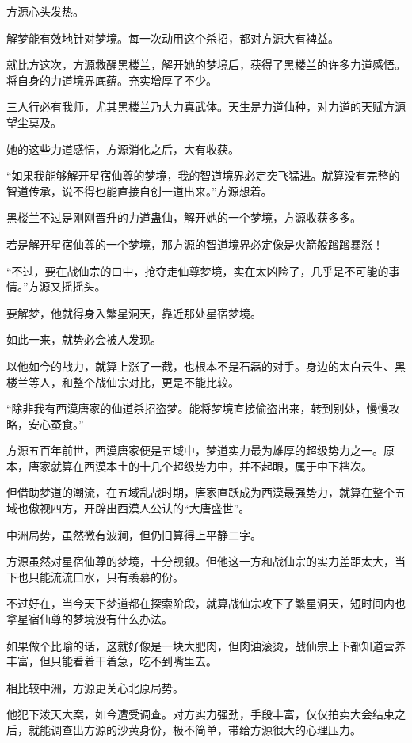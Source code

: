\begin{this_body}
方源心头发热。

解梦能有效地针对梦境。每一次动用这个杀招，都对方源大有裨益。

就比方这次，方源救醒黑楼兰，解开她的梦境后，获得了黑楼兰的许多力道感悟。将自身的力道境界底蕴。充实增厚了不少。

三人行必有我师，尤其黑楼兰乃大力真武体。天生是力道仙种，对力道的天赋方源望尘莫及。

她的这些力道感悟，方源消化之后，大有收获。

“如果我能够解开星宿仙尊的梦境，我的智道境界必定突飞猛进。就算没有完整的智道传承，说不得也能直接自创一道出来。”方源想着。

黑楼兰不过是刚刚晋升的力道蛊仙，解开她的一个梦境，方源收获多多。

若是解开星宿仙尊的一个梦境，那方源的智道境界必定像是火箭般蹭蹭暴涨！

“不过，要在战仙宗的口中，抢夺走仙尊梦境，实在太凶险了，几乎是不可能的事情。”方源又摇摇头。

要解梦，他就得身入繁星洞天，靠近那处星宿梦境。

如此一来，就势必会被人发现。

以他如今的战力，就算上涨了一截，也根本不是石磊的对手。身边的太白云生、黑楼兰等人，和整个战仙宗对比，更是不能比较。

“除非我有西漠唐家的仙道杀招盗梦。能将梦境直接偷盗出来，转到别处，慢慢攻略，安心蚕食。”

方源五百年前世，西漠唐家便是五域中，梦道实力最为雄厚的超级势力之一。原本，唐家就算在西漠本土的十几个超级势力中，并不起眼，属于中下档次。

但借助梦道的潮流，在五域乱战时期，唐家直跃成为西漠最强势力，就算在整个五域也傲视四方，开辟出西漠人公认的“大唐盛世”。

中洲局势，虽然微有波澜，但仍旧算得上平静二字。

方源虽然对星宿仙尊的梦境，十分觊觎。但他这一方和战仙宗的实力差距太大，当下也只能流流口水，只有羡慕的份。

不过好在，当今天下梦道都在探索阶段，就算战仙宗攻下了繁星洞天，短时间内也拿星宿仙尊的梦境没有什么办法。

如果做个比喻的话，这就好像是一块大肥肉，但肉油滚烫，战仙宗上下都知道营养丰富，但只能看着干着急，吃不到嘴里去。

相比较中洲，方源更关心北原局势。

他犯下泼天大案，如今遭受调查。对方实力强劲，手段丰富，仅仅拍卖大会结束之后，就能调查出方源的沙黄身份，极不简单，带给方源很大的心理压力。


\end{this_body}

